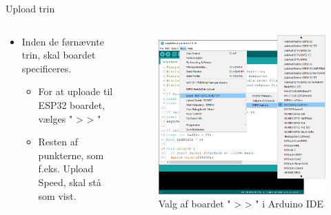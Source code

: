 \documentclass[aspectratio=169]{beamer}
\begin{document}
\begin{frame}{Upload trin}
\begin{columns}

	\begin{column}{0.5\textwidth}
		\begin{textBox}
			\begin{itemize}
				\item Inden de førnævnte trin, skal boardet specificeres.
				\begin{itemize}
					\item For at uploade til ESP32 boardet, vælges " >  > "
					\item Resten af punkterne, som f.eks. Upload Speed, skal stå som vist.
				\end{itemize}
			\end{itemize}
		\end{textBox}
	\end{column}

	\begin{column}{0.5\textwidth}
		\begin{figure}
  			\includegraphics[height=0.6\textheight,keepaspectratio=true]{assets/pictures/boardselection.png}
  			\caption{Valg af boardet " >  > " i Arduino IDE}
  			\label{fig:boardselection}
		\end{figure}
	\end{column}

\end{columns}
\end{frame}
\end{document}
